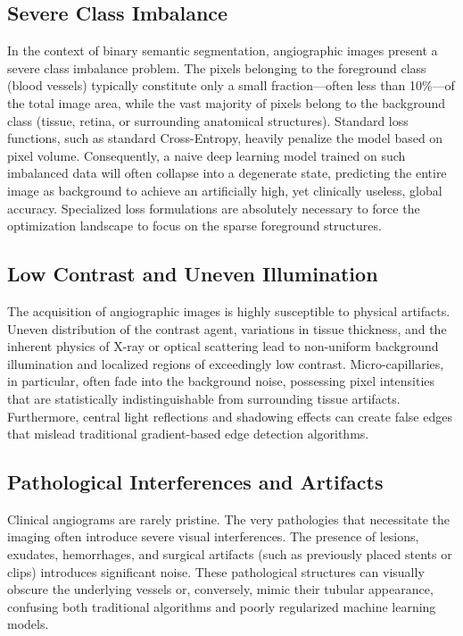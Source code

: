 \subsection{Severe Class Imbalance}
In the context of binary semantic segmentation, angiographic images present a severe class imbalance problem. The pixels belonging to the foreground class (blood vessels) typically constitute only a small fraction---often less than 10\%---of the total image area, while the vast majority of pixels belong to the background class (tissue, retina, or surrounding anatomical structures). Standard loss functions, such as standard Cross-Entropy, heavily penalize the model based on pixel volume. Consequently, a naive deep learning model trained on such imbalanced data will often collapse into a degenerate state, predicting the entire image as background to achieve an artificially high, yet clinically useless, global accuracy. Specialized loss formulations are absolutely necessary to force the optimization landscape to focus on the sparse foreground structures.

\subsection{Low Contrast and Uneven Illumination}
The acquisition of angiographic images is highly susceptible to physical artifacts. Uneven distribution of the contrast agent, variations in tissue thickness, and the inherent physics of X-ray or optical scattering lead to non-uniform background illumination and localized regions of exceedingly low contrast. Micro-capillaries, in particular, often fade into the background noise, possessing pixel intensities that are statistically indistinguishable from surrounding tissue artifacts. Furthermore, central light reflections and shadowing effects can create false edges that mislead traditional gradient-based edge detection algorithms.

\subsection{Pathological Interferences and Artifacts}
Clinical angiograms are rarely pristine. The very pathologies that necessitate the imaging often introduce severe visual interferences. The presence of lesions, exudates, hemorrhages, and surgical artifacts (such as previously placed stents or clips) introduces significant noise. These pathological structures can visually obscure the underlying vessels or, conversely, mimic their tubular appearance, confusing both traditional algorithms and poorly regularized machine learning models.

